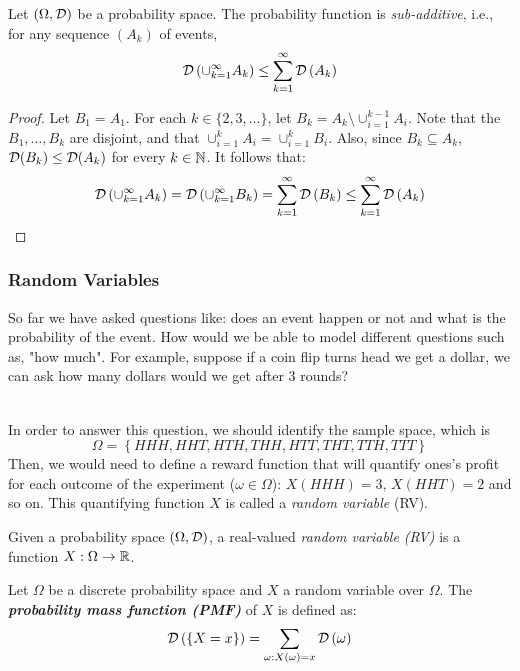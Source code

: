 \begin{theorem} Let $(\Omega, \mathcal{D})$ be a probability space. The probability function is \emph{sub-additive}, i.e., for any sequence $\left(A_k\right)$ of events,
	\[
	\mathcal{D}\left(\cup_{k=1}^\infty A_k\right) \le \sum_{k=1} ^\infty \mathcal{D}\left(A_k\right)
	\]
\end{theorem}
\begin{proof}
Let $B_1=A_1$. For each $k \in \{2,3,\ldots\}$, let $B_k = A_k\setminus \cup_{i=1}^{k-1} A_i$. Note that the $B_1,\ldots,B_k$ are disjoint, and that $\cup_{i=1}^k A_i=\cup_{i=1}^k B_i$. Also, since $B_k\subseteq A_k$, $\mathcal{D}(B_k) \le \mathcal{D}(A_k)$ for every $k \in \mathbb{N}$. It follows that:
	\[
	\mathcal{D}\left(\cup_{k=1}^\infty A_k\right) = \mathcal{D}\left(\cup_{k=1}^\infty B_k\right) = \sum_{k=1}
	^\infty \mathcal{D}\left(B_k\right) \le \sum_{k=1}
	^\infty \mathcal{D}\left(A_k\right)
	\]
\end{proof}


\subsubsection{Random Variables}

So far we have asked questions like: does an event happen or not and what is the probability of the event. How would we be able to model different questions such as, "how much". For example, suppose if a coin flip turns head we get a dollar, we can ask how many dollars would we get after 3 rounds?  

~\\In order to answer this question, we should identify the sample space, which is $$\Omega=\left\{HHH,HHT,HTH,THH,HTT,THT,TTH,TTT\right\}$$ Then, we would need to define a reward function that will quantify ones's profit for each outcome of the experiment ($\omega\in \Omega$): $X\left(HHH\right)=3,\, X\left(HHT\right)=2$ and so on. This quantifying function $X$ is called a \textit{random variable} (RV).

\begin{definition}
Given a probability space $\left(\Omega,\mathcal{D}\right)$, a real-valued \textit{random variable (RV)} is a function $X:\Omega\rightarrow\mathbb{R}$.
\end{definition}

\begin{definition}
Let $\Omega$ be a discrete probability space and $X$ a random variable over $\Omega$. The \textbf{\textit{probability
		mass function (PMF)}} of $X$ is defined as:
\[
\mathcal{D}\left(\left\{ X=x\right\} \right)=\sum_{\omega:X\left(\omega\right)=x}\mathcal{D}\left(\omega\right)
\]
\end{definition}

